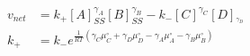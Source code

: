 \begin{eqnarray}
v_{net} & = k_+[A]_{SS}^{\gamma_A}[B]_{SS}^{\gamma_B} - k_-[C]^{\gamma_C}[D]_^{\gamma_D} \\
k_+ &=  k_-e^{\frac{1}{RT}\left(\gamma_C\mu_C^\circ+ \gamma_D\mu_D^\circ -\gamma_A\mu_A^\circ-\gamma_B\mu_B^\circ\right)} \\
\end{eqnarray}